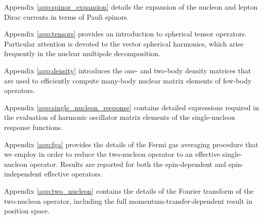 \documentclass[12pt,letterpaper]{book}
\begin{document}
Appendix \ref{app:spinor_expansion} details the expansion of the nucleon and lepton Dirac currents in terms of Pauli spinors.

Appendix \ref{app:tensors} provides an introduction to spherical tensor operators. Particular attention is devoted to the vector spherical harmonics, which arise frequently in the nuclear multipole decomposition.

Appendix \ref{app:density} introduces the one- and two-body density matrices that are used to efficiently compute many-body nuclear matrix elements of few-body operators.

Appendix \ref{app:single_nucleon_response} contains detailed expressions required in the evaluation of harmonic oscillator matrix elements of the single-nucleon response functions. 

Appendix \ref{app:fga} provides the details of the Fermi gas averaging procedure that we employ in order to reduce the two-nucleon operator to an effective single-nucleon operator. Results are reported for both the spin-dependent and spin-independent effective operators.

Appendix \ref{app:two_nucleon} contains the details of the Fourier transform of the two-nucleon operator, including the full momentum-transfer-dependent result in position space.


 
\end{document}
